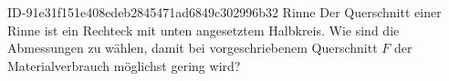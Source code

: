 \begin{exercise}
      {ID-91e31f151e408edeb2845471ad6849c302996b32}
      {Rinne}
  \ifproblem\problem
    Der Querschnitt einer Rinne ist ein Rechteck mit unten angesetztem Halbkreis.
    Wie sind die Abmessungen zu wählen, damit bei vorgeschriebenem Querschnitt $F$
    der Materialverbrauch möglichst gering wird?
  \fi
\end{exercise}
